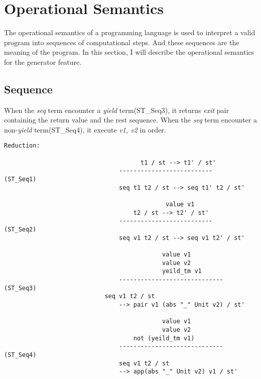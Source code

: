 \section{Operational Semantics}
\label{sec:os}
The operational semantics of a programming language is used to interpret a valid program into sequences of computational steps. And these sequences are the meaning of the program. In this section, I will describe the operational semantics for the generator feature.

\subsection{Sequence}
When the \textit{seq} term encounter a \textit{yield} term(ST_Seq3), it returns \textit{exit} pair containing the return value and the rest sequence. When the \textit{seq} term encounter a non-\textit{yield} term(ST_Seq4), it execute \textit{v1, v2} in order.
\begin{lstlisting}
Reduction:

								      t1 / st --> t1' / st'
								--------------------------         (ST_Seq1)
								seq t1 t2 / st --> seq t1' t2 / st'
								
										     value v1
									t2 / st --> t2' / st'
								--------------------------         (ST_Seq2)
								seq v1 t2 / st --> seq v1 t2' / st'
								
											value v1
											value v2
											yeild_tm v1
								-----------------------------    (ST_Seq3)
							seq v1 t2 / st 
								--> pair v1 (abs "_" Unit v2) / st'
								
											value v1
											value v2
									not (yeild_tm v1)
								-----------------------------    (ST_Seq4)
								seq v1 t2 / st 
								--> app(abs "_" Unit v2) v1 / st'

\end{lstlisting}

